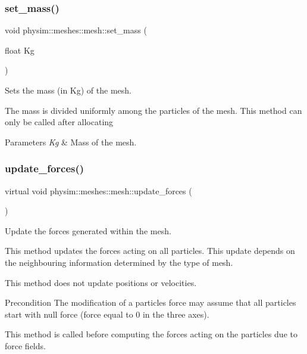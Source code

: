 \subsubsection{\texorpdfstring{set\+\_\+mass()}{set\_mass()}}
{\footnotesize\ttfamily void physim\+::meshes\+::mesh\+::set\+\_\+mass (\begin{DoxyParamCaption}\item[{float}]{Kg }\end{DoxyParamCaption})}



Sets the mass (in Kg) of the mesh. 

The mass is divided uniformly among the particles of the mesh. This method can only be called after allocating 
\begin{DoxyParams}{Parameters}
{\em Kg} & Mass of the mesh. \\
\hline
\end{DoxyParams}
\mbox{\label{classphysim_1_1meshes_1_1mesh_ad7cad4cd454cce562c8c404ef09f8bd3}} 
\subsubsection{\texorpdfstring{update\+\_\+forces()}{update\_forces()}}
{\footnotesize\ttfamily virtual void physim\+::meshes\+::mesh\+::update\+\_\+forces (\begin{DoxyParamCaption}{ }\end{DoxyParamCaption})\hspace{0.3cm}{\ttfamily [pure virtual]}}



Update the forces generated within the mesh. 

This method updates the forces acting on all particles. This update depends on the neighbouring information determined by the type of mesh.

This method does not update positions or velocities.

\begin{DoxyPrecond}{Precondition}
The modification of a particles\textquotesingle{} force may assume that all particles start with null force (force equal to 0 in the three axes). 

This method is called before computing the forces acting on the particles due to force fields. 
\end{DoxyPrecond}


